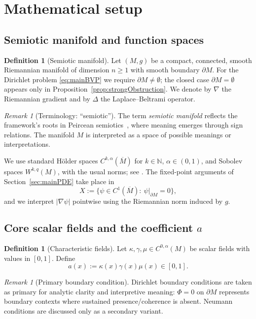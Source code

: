 \documentclass[11pt]{article}
\theoremstyle{plain}
\theoremstyle{definition}
\newtheorem{definition}[theorem]{Definition}
\theoremstyle{remark}
\newtheorem{remark}[theorem]{Remark}
\newcommand{\abs}[1]{\left\lvert #1\right\rvert}
\begin{document}
\section{Mathematical setup}
\subsection{Semiotic manifold and function spaces}
\begin{definition}[Semiotic manifold]\label{def:semioticManifold}
Let \((M,g)\) be a compact, connected, smooth Riemannian manifold of dimension \(n\ge 1\) with smooth boundary \(\partial M\). For the Dirichlet problem \eqref{eq:mainBVP} we require \(\partial M\ne\emptyset\); the closed case \(\partial M=\emptyset\) appears only in Proposition~\ref{prop:strongObstruction}.
We denote by \(\nabla\) the Riemannian gradient and by \(\Delta\) the Laplace--Beltrami operator.
\end{definition}

\begin{remark}[Terminology: ``semiotic'']
The term \emph{semiotic manifold} reflects the framework's roots in Peircean semiotics~\cite{Peirce1931}, where meaning emerges through sign relations. The manifold \(M\) is interpreted as a space of possible meanings or interpretations.
\end{remark}

We use standard H\"older spaces \(C^{k,\alpha}(\overline M)\) for \(k\in\mathbb{N}\), \(\alpha\in(0,1)\), and Sobolev spaces \(W^{k,q}(M)\), with the usual norms; see \cite{GilbargTrudinger2001,Evans2010}.
The fixed-point arguments of Section~\ref{sec:mainPDE} take place in
\[
X := \{\psi\in C^1(\overline M):\ \psi|_{\partial M}=0\},
\]
and we interpret \(\abs{\nabla \psi}\) pointwise using the Riemannian norm induced by \(g\).

\subsection{Core scalar fields and the coefficient \(a\)}
\begin{definition}[Characteristic fields]\label{def:fields}
Let \(\kappa,\gamma,\mu\in C^{0,\alpha}(M)\) be scalar fields with values in \([0,1]\). Define
\[
a(x) := \kappa(x)\gamma(x)\mu(x)\in[0,1].
\]
\end{definition}

\begin{remark}[Primary boundary condition]
Dirichlet boundary conditions are taken as primary for analytic clarity and interpretive meaning: \(\Phi=0\) on \(\partial M\) represents boundary contexts where sustained presence/coherence is absent.
Neumann conditions are discussed only as a secondary variant.
\end{remark}
\end{document}
